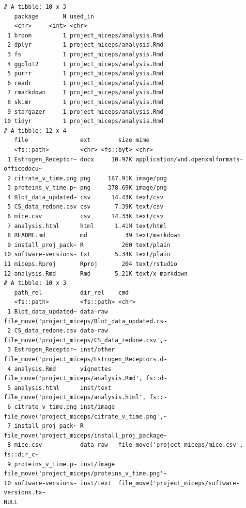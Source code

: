 \documentclass[12pt,twoside]{reedthesis}
\begin{document}
\begin{verbatim}
# A tibble: 10 x 3
   package       N used_in                    
   <chr>     <int> <chr>                      
 1 broom         1 project_miceps/analysis.Rmd
 2 dplyr         1 project_miceps/analysis.Rmd
 3 fs            1 project_miceps/analysis.Rmd
 4 ggplot2       1 project_miceps/analysis.Rmd
 5 purrr         1 project_miceps/analysis.Rmd
 6 readr         1 project_miceps/analysis.Rmd
 7 rmarkdown     1 project_miceps/analysis.Rmd
 8 skimr         1 project_miceps/analysis.Rmd
 9 stargazer     1 project_miceps/analysis.Rmd
10 tidyr         1 project_miceps/analysis.Rmd
# A tibble: 12 x 4
   file               ext        size mime                                      
   <fs::path>         <chr> <fs::byt> <chr>                                     
 1 Estrogen_Receptor~ docx     10.97K application/vnd.openxmlformats-officedocu~
 2 citrate_v_time.png png     187.91K image/png                                 
 3 proteins_v_time.p~ png     378.69K image/png                                 
 4 Blot_data_updated~ csv      14.43K text/csv                                  
 5 CS_data_redone.csv csv       7.39K text/csv                                  
 6 mice.csv           csv      14.33K text/csv                                  
 7 analysis.html      html      1.41M text/html                                 
 8 README.md          md           39 text/markdown                             
 9 install_proj_pack~ R           260 text/plain                                
10 software-versions~ txt       5.34K text/plain                                
11 miceps.Rproj       Rproj       204 text/rstudio                              
12 analysis.Rmd       Rmd       5.21K text/x-markdown                           
# A tibble: 10 x 3
   path_rel           dir_rel    cmd                                            
   <fs::path>         <fs::path> <chr>                                          
 1 Blot_data_updated~ data-raw   file_move('project_miceps/Blot_data_updated.cs~
 2 CS_data_redone.csv data-raw   file_move('project_miceps/CS_data_redone.csv',~
 3 Estrogen_Receptor~ inst/other file_move('project_miceps/Estrogen_Receptors.d~
 4 analysis.Rmd       vignettes  file_move('project_miceps/analysis.Rmd', fs::d~
 5 analysis.html      inst/text  file_move('project_miceps/analysis.html', fs::~
 6 citrate_v_time.png inst/image file_move('project_miceps/citrate_v_time.png',~
 7 install_proj_pack~ R          file_move('project_miceps/install_proj_package~
 8 mice.csv           data-raw   file_move('project_miceps/mice.csv', fs::dir_c~
 9 proteins_v_time.p~ inst/image file_move('project_miceps/proteins_v_time.png'~
10 software-versions~ inst/text  file_move('project_miceps/software-versions.tx~
NULL
\end{verbatim}
\normalsize
\end{document}
